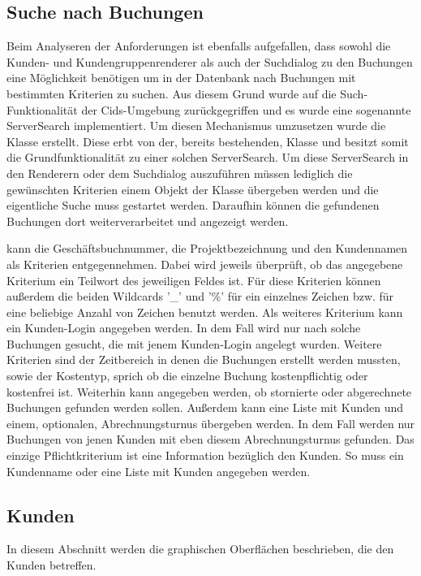 \subsection{Suche nach Buchungen} \label{subsec:serversearch}
Beim Analyseren der Anforderungen ist ebenfalls aufgefallen, dass sowohl die Kunden- und Kundengruppenrenderer als auch der Suchdialog zu den Buchungen eine Möglichkeit benötigen um in der Datenbank nach Buchungen mit bestimmten Kriterien zu suchen.
Aus diesem Grund wurde auf die Such-Funktionalität der Cids-Umgebung zurückgegriffen und es wurde eine sogenannte ServerSearch implementiert.
Um diesen Mechanismus umzusetzen wurde die Klasse  erstellt.
Diese erbt von der, bereits bestehenden, Klasse  und besitzt somit die Grundfunktionalität zu einer solchen ServerSearch.
Um diese ServerSearch in den Renderern oder dem Suchdialog auszuführen müssen lediglich die gewünschten Kriterien einem Objekt der Klasse  übergeben werden und die eigentliche Suche muss gestartet werden.
Daraufhin können die gefundenen Buchungen dort weiterverarbeitet und angezeigt werden.

 kann die Geschäftsbuchnummer, die Projektbezeichnung und den Kundennamen als Kriterien entgegennehmen.
Dabei wird jeweils überprüft, ob das angegebene Kriterium ein Teilwort des jeweiligen Feldes ist.
Für diese Kriterien können außerdem die beiden Wildcards '\_' und '\%' für ein einzelnes Zeichen bzw. für eine beliebige Anzahl von Zeichen benutzt werden.
Als weiteres Kriterium kann ein Kunden-Login angegeben werden.
In dem Fall wird nur nach solche Buchungen gesucht, die mit jenem Kunden-Login angelegt wurden.
Weitere Kriterien sind der Zeitbereich in denen die Buchungen erstellt werden mussten, sowie der Kostentyp, sprich ob die einzelne Buchung kostenpflichtig oder kostenfrei ist.
Weiterhin kann angegeben werden, ob stornierte oder abgerechnete Buchungen gefunden werden sollen.
Außerdem kann eine Liste mit Kunden und einem, optionalen, Abrechnungsturnus übergeben werden.
In dem Fall werden nur Buchungen von jenen Kunden mit eben diesem  Abrechnungsturnus gefunden.
Das einzige Pflichtkriterium ist eine Information bezüglich den Kunden. So muss ein Kundenname oder eine Liste mit Kunden angegeben werden.

\subsection{Kunden}
In diesem Abschnitt werden die graphischen Oberflächen beschrieben, die den Kunden betreffen.
